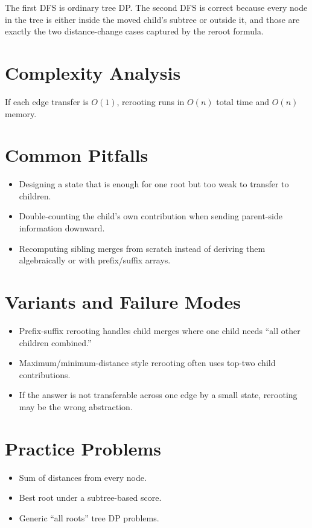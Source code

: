 The first DFS is ordinary tree DP. The second DFS is correct because every node in the tree is either inside the moved
child's subtree or outside it, and those are exactly the two distance-change cases captured by the reroot formula.

\section*{Complexity Analysis}

If each edge transfer is \(O(1)\), rerooting runs in \(O(n)\) total time and \(O(n)\) memory.

\section*{Common Pitfalls}

\begin{itemize}
  \item Designing a state that is enough for one root but too weak to transfer to children.
  \item Double-counting the child's own contribution when sending parent-side information downward.
  \item Recomputing sibling merges from scratch instead of deriving them algebraically or with prefix/suffix arrays.
\end{itemize}

\section*{Variants and Failure Modes}

\begin{itemize}
  \item Prefix-suffix rerooting handles child merges where one child needs ``all other children combined.''
  \item Maximum/minimum-distance style rerooting often uses top-two child contributions.
  \item If the answer is not transferable across one edge by a small state, rerooting may be the wrong abstraction.
\end{itemize}

\section*{Practice Problems}

\begin{itemize}
  \item Sum of distances from every node.
  \item Best root under a subtree-based score.
  \item Generic ``all roots'' tree DP problems.
\end{itemize}

